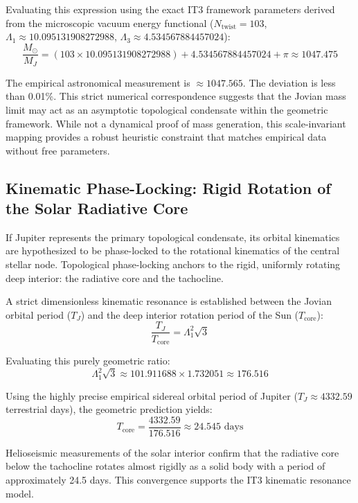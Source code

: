 \documentclass[11pt,a4paper]{article}
\theoremstyle{remark}
\newcommand{\Ntwist}{N_{\mathrm{twist}}}
\newcommand{\Lone}{\Lambda_1}
\newcommand{\Lthree}{\Lambda_3}
\newcommand{\LoneVal}{10.095131908272988}
\newcommand{\LthreeVal}{4.534567884457024}
\begin{document}
Evaluating this expression using the exact IT3 framework parameters derived from the microscopic vacuum energy functional ($\Ntwist = 103$, $\Lone \approx \LoneVal$, $\Lthree \approx \LthreeVal$):
\begin{equation}
    \frac{M_\odot}{M_J} = (103 \times \LoneVal) + \LthreeVal + \pi \approx 1047.475
\end{equation}

The empirical astronomical measurement is $\approx 1047.565$. The deviation is less than 0.01\%. This strict numerical correspondence suggests that the Jovian mass limit may act as an asymptotic topological condensate within the geometric framework. While not a dynamical proof of mass generation, this scale-invariant mapping provides a robust heuristic constraint that matches empirical data without free parameters.

\subsection{Kinematic Phase-Locking: Rigid Rotation of the Solar Radiative Core}

If Jupiter represents the primary topological condensate, its orbital kinematics are hypothesized to be phase-locked to the rotational kinematics of the central stellar node. Topological phase-locking anchors to the rigid, uniformly rotating deep interior: the radiative core and the tachocline.

A strict dimensionless kinematic resonance is established between the Jovian orbital period ($T_J$) and the deep interior rotation period of the Sun ($T_{\text{core}}$):
\begin{equation}
    \frac{T_J}{T_{\text{core}}} = \Lone^2 \sqrt{3}
\end{equation}

Evaluating this purely geometric ratio:
\begin{equation}
    \Lone^2 \sqrt{3} \approx 101.911688 \times 1.732051 \approx 176.516
\end{equation}

Using the highly precise empirical sidereal orbital period of Jupiter ($T_J \approx 4332.59$ terrestrial days), the geometric prediction yields:
\begin{equation}
    T_{\text{core}} = \frac{4332.59}{176.516} \approx 24.545 \text{ days}
\end{equation}

Helioseismic measurements of the solar interior confirm that the radiative core below the tachocline rotates almost rigidly as a solid body with a period of approximately 24.5 days. This convergence supports the IT3 kinematic resonance model.
\end{document}
